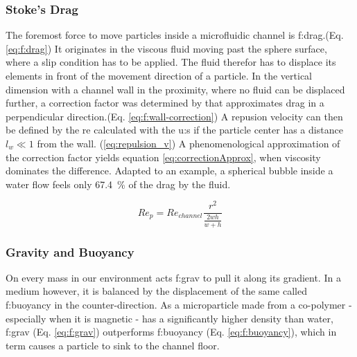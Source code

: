 \subsubsection{Stoke's Drag}
The foremost force to move particles inside a microfluidic channel is \gls{f:drag}.(Eq. \ref{eq:f:drag}) It originates in the viscous fluid moving past the sphere surface, where a slip condition has to be applied. The fluid therefor has to displace its elements in front of the movement direction of a particle. \cite{lit:fluidic:motion_sphere_to_plane_surface} 
In the vertical dimension with a channel wall in the proximity, where no fluid can be displaced further, a correction factor was determined by  that approximates drag in a perpendicular direction.(Eq. \ref{eq:f:wall-correction})\cite{lit:fluidic:f_wall} A repusion velocity can then be defined by the \acrlong{re} calculated with the \gls{u:s} if the particle center has a distance $l_w \ll 1$ from the wall. (\ref{eq:repulsion_v}) \cite{lit:fluidic:motion_sphere_surface_2009} A phenomenological approximation of the correction factor yields equation \ref{eq:correctionApprox}, when viscosity dominates the difference. Adapted to an example, a spherical bubble inside a water flow feels only \SI{67.4}{\percent} of the drag by the fluid.

\begin{equation}
	\mathit{Re}_p = \mathit{Re}_{channel} \frac{r^2}{\frac{2wh}{w+h}} 
\end{equation}

\subsubsection{Gravity and Buoyancy}
On every mass in our environment acts \gls{f:grav} to pull it along its gradient. In a medium however, it is balanced by the displacement of the same called \gls{f:buoyancy} in the counter-direction. As a microparticle made from a co-polymer - especially when it is magnetic - has a significantly higher density than water, \gls{f:grav} (Eq. \ref{eq:f:grav}) outperforms \gls{f:buoyancy} (Eq. \ref{eq:f:buoyancy}), which in term causes a particle to sink to the channel floor.

